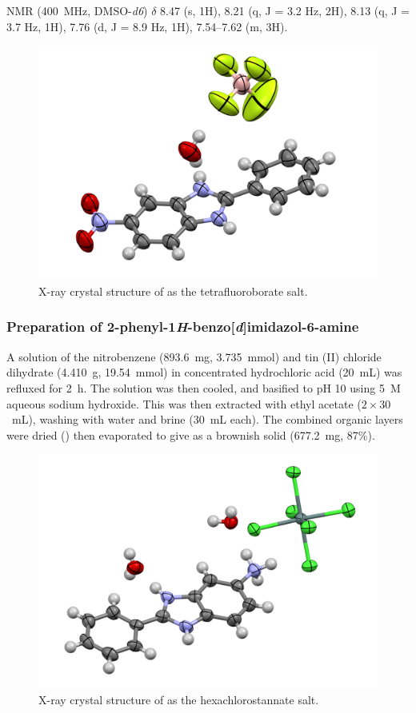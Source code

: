 \begin{refsection}
 NMR (400~MHz, DMSO-\emph{d6}) $\delta$ 8.47 (s, 1H), 8.21 (q, J = 3.2 Hz, 2H), 8.13 (q, J = 3.7 Hz, 1H), 7.76 (d, J = 8.9 Hz, 1H), 7.54--7.62 (m, 3H). 

\begin{figure}[ht]
    \centering
    \includegraphics[width=0.8\linewidth]{Figures/rhs-nitro-xray.pdf}
    \caption{X-ray crystal structure of  as the tetrafluoroborate salt.}
    \label{fig:rhs-nitro-xray}
\end{figure}

\subsubsection{Preparation of 2-phenyl-1\emph{H}-benzo[\emph{d}]imidazol-6-amine }
A solution of the nitrobenzene  (893.6~mg, 3.735~mmol) and tin (II) chloride dihydrate (4.410~g, 19.54~mmol) in concentrated hydrochloric acid (20~mL) was refluxed for 2~h. 
The solution was then cooled, and basified to pH 10 using 5~M aqueous sodium hydroxide.
This was then extracted with ethyl acetate ($2\times30$~mL), washing with water and brine (30~mL each).
The combined organic layers were dried () then evaporated to give  as a brownish solid (677.2~mg, 87\%).

\begin{figure}[ht]
    \centering
    \includegraphics[width=0.8\linewidth]{Figures/rhs-amine-xray.pdf}
    \caption{X-ray crystal structure of  as the hexachlorostannate salt.}
    \label{fig:rhs-amine-xray}
\end{figure}


\end{refsection}
